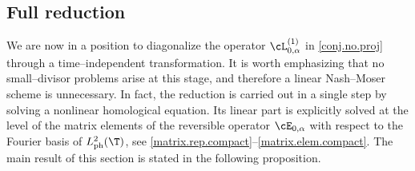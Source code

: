 \documentclass[a4paper,reqno,10pt]{article}
\begin{document}
\subsection{Full reduction}\label{section-Full-redu}
We are now in a position to diagonalize the operator $\cL_{0,\alpha}^{(1)}$ in \eqref{conj.no.proj}
through a time–independent transformation.  
It is worth emphasizing that no small–divisor problems arise at this stage,
and therefore a linear Nash--Moser scheme is unnecessary.  
In fact, the reduction is carried out in a single step by solving a
nonlinear homological equation.  
Its linear part is explicitly solved at the level of the matrix elements of the
reversible operator $\cE_{0,\alpha}$ with respect to the Fourier basis of
$L_{\rm ph}^2(\T)$, see \eqref{matrix.rep.compact}–\eqref{matrix.elem.compact}.  
The main result of this section is stated in the following proposition.
\end{document}
